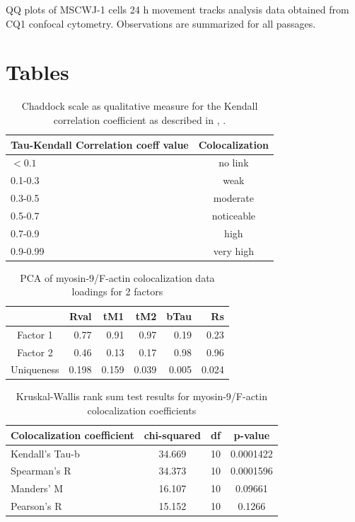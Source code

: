 \documentclass[num-refs]{wiley-article}
\begin{document}
QQ plots of MSCWJ-1 cells 24 h movement tracks analysis data obtained from CQ1 confocal cytometry. Observations are summarized for all passages.




\section*{Tables}

\begin{table}[hb!]
  \caption{Chaddock scale as qualitative measure for the Kendall correlation coefficient as described in \cite{hinkle2003applied}, \cite{mukaka2012guide}.}
\centering
\begin{tabular}{l|c|}
  Tau-Kendall Correlation coeff value & Colocalization \\
 \hline
 $ <0.1 $ & no link \\
 0.1-0.3 & weak \\
 0.3-0.5 & moderate \\
 0.5-0.7 & noticeable \\
 0.7-0.9 & high \\
 0.9-0.99 & very high
\end{tabular}
\end{table}

\begin{table}[hbt!]
  \caption{PCA of myosin-9/F-actin colocalization data loadings for 2 factors}
\centering
\begin{tabular}{c|rrrrr}
  \hline
  & Rval & tM1 & tM2 & bTau & Rs \\
  \hline
Factor 1 & 0.77 & 0.91 & 0.97 & 0.19 & 0.23 \\
  Factor 2 & 0.46 & 0.13 & 0.17 & 0.98 & 0.96 \\
Uniqueness &  0.198 & 0.159 & 0.039 & 0.005 & 0.024 \\
   \hline
\end{tabular}
\end{table}

\begin{table}[hbt!]
  \caption{Kruskal-Wallis rank sum test results for myosin-9/F-actin colocalization coefficients}
\centering
\begin{tabular}{l|ccc}
    \hline
 Colocalization coefficient & chi-squared & df & p-value  \\
   \hline
 Kendall's Tau-b & 34.669 & 10 & 0.0001422 \\
 Spearman's R & 34.373 & 10 &  0.0001596 \\
 Manders' M & 16.107 & 10 & 0.09661 \\
 Pearson's R & 15.152 & 10 & 0.1266
\end{tabular}
\end{table}
\end{document}
